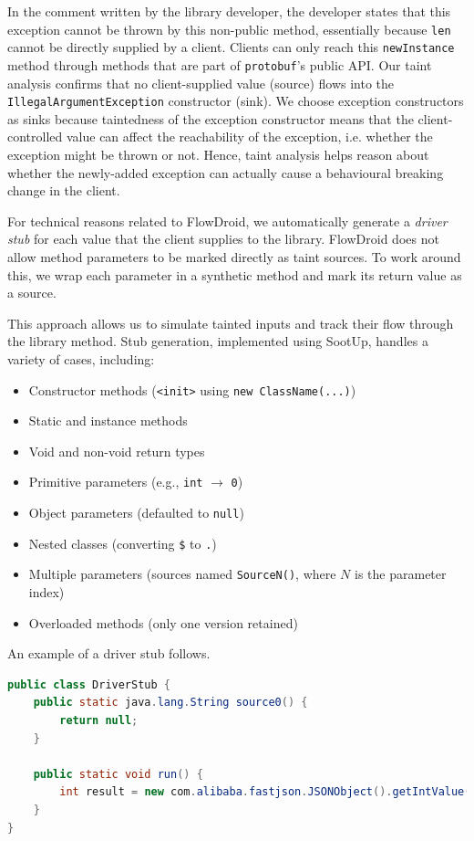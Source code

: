 In the comment written by the library developer, the developer states that this exception cannot be thrown by this non-public method, essentially because \texttt{len} cannot be directly supplied by a client. Clients can only reach this \texttt{newInstance} method through methods that are part of \texttt{protobuf}'s public API. Our taint analysis confirms that no client-supplied value (source) flows into the \texttt{IllegalArgumentException} constructor (sink). We choose exception constructors as sinks because taintedness of the exception constructor means that the client-controlled value can affect the reachability of the exception, i.e. whether the exception might be thrown or not. Hence, taint analysis helps reason about whether the newly-added exception can actually cause a behavioural breaking change in the client.

For technical reasons related to FlowDroid, we automatically generate a \textit{driver stub} for each value that the client supplies to the library. FlowDroid does not allow method parameters to be marked directly as taint sources. To work around this, we wrap each parameter in a synthetic method and mark its return value as a source.

This approach allows us to simulate tainted inputs and track their flow through the library method. Stub generation, implemented using SootUp, handles a variety of cases, including:
\begin{itemize}
  \item Constructor methods (\texttt{<init>} using \texttt{new ClassName(...)})
  \item Static and instance methods
  \item Void and non-void return types
  \item Primitive parameters (e.g., \texttt{int} $\rightarrow$ \texttt{0})
  \item Object parameters (defaulted to \texttt{null})
  \item Nested classes (converting \texttt{\$} to \texttt{.})
  \item Multiple parameters (sources named \texttt{SourceN()}, where $N$ is the parameter index)
  \item Overloaded methods (only one version retained)
\end{itemize}

An example of a driver stub follows.
\begin{lstlisting}[language=Java]
public class DriverStub {
    public static java.lang.String source0() {
        return null;
    }

    public static void run() {
        int result = new com.alibaba.fastjson.JSONObject().getIntValue(source0());
    }
}
\end{lstlisting}

